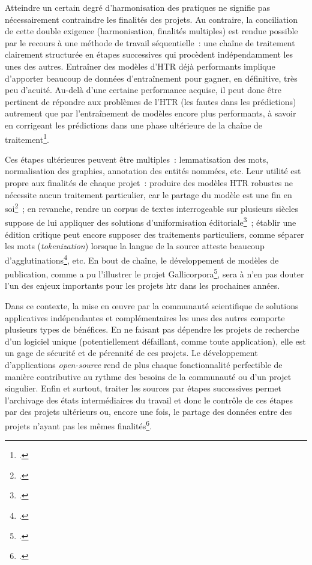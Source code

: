 \documentclass[a4paper,12pt,twoside]{book}
\begin{document}
		Atteindre un certain degré d'harmonisation des pratiques ne signifie pas
		nécessairement contraindre les finalités des projets. Au contraire, la
		conciliation de cette double exigence (harmonisation, finalités
		multiples) est rendue possible par le recours à une méthode de travail
		séquentielle~: une chaîne de traitement clairement structurée en étapes
		successives qui procèdent indépendamment les unes des autres. Entraîner
		des modèles d'HTR déjà performants implique d'apporter beaucoup de
		données d'entraînement pour gagner, en définitive, très peu d'acuité.
		Au-delà d'une certaine performance acquise, il peut donc être pertinent
		de répondre aux problèmes de l'HTR (les fautes dans les \glspl{prédiction})
		autrement que par l'entraînement de modèles encore plus performants, à
		savoir en corrigeant les \glspl{prédiction} dans une phase ultérieure de la
		chaîne de traitement\footcite{torresaguilarModelisationAffinageHTR2022}.
		
		Ces étapes ultérieures peuvent être multiples~: lemmatisation des mots,
		normalisation des graphies, annotation des entités nommées, etc. Leur
		utilité est propre aux finalités de chaque projet~: produire des modèles
		HTR robustes ne nécessite aucun traitement particulier, car le partage
		du modèle est une fin en soi\footcite{campsCremmaLabProjectsTranscription2022}~; en revanche, rendre un
		corpus de textes interrogeable sur plusieurs siècles suppose de lui
		appliquer des solutions d'uniformisation éditoriale\footcite{bizais-lilligExperimentationsPourAnalyse2022, torresaguilarModelisationAffinageHTR2022}~; établir une édition
		critique peut encore supposer des traitements particuliers, comme
		séparer les mots (\textit{tokenization}) lorsque la langue de la source
		atteste beaucoup d'agglutinations\footcite{stoklbenezraHTRCriticalEdition2022}, etc. En bout de chaîne, le
		développement de modèles de publication, comme a pu l'illustrer le
		projet Gallicorpora\footcite{gabaySegmOntoControlledVocabulary2022}, sera à
		n'en pas douter l'un des enjeux importants pour les projets \gls{htr} dans les
		prochaines années.
		
		Dans ce contexte, la mise en œuvre par la communauté scientifique de
		solutions applicatives indépendantes et complémentaires les unes des
		autres comporte plusieurs types de bénéfices. En ne faisant pas dépendre
		les projets de recherche d'un logiciel unique (potentiellement
		défaillant, comme toute application), elle est un gage de sécurité et de
		pérennité de ces projets. Le développement d'applications
		\textit{open-source} rend de plus chaque fonctionnalité perfectible de
		manière contributive au rythme des besoins de la communauté ou d'un
		projet singulier. Enfin et surtout, traiter les sources par étapes
		successives permet l'archivage des états intermédiaires du travail et
		donc le contrôle de ces étapes par des projets ultérieurs ou, encore une
		fois, le partage des données entre des projets n'ayant pas les mêmes
		finalités\footcite{campsCremmaLabProjectsTranscription2022}.
			
\end{document}
